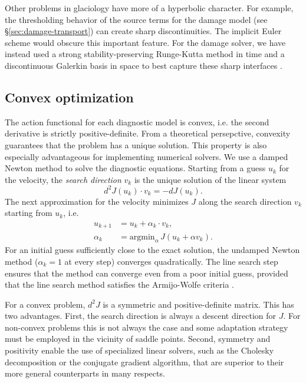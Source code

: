 \documentclass[journal abbreviation, manuscript]{copernicus}
\begin{document}
Other problems in glaciology have more of a hyperbolic character.
For example, the thresholding behavior of the source terms for the damage model (see \S\ref{sec:damage-transport}) can create sharp discontinuities.
The implicit Euler scheme would obscure this important feature.
For the damage solver, we have instead used a strong stability-preserving Runge-Kutta method in time and a discontinuous Galerkin basis in space to best capture these sharp interfaces \citep{shu1988efficient}.


\subsection{Convex optimization}

The action functional for each diagnostic model is convex, i.e. the second derivative is strictly positive-definite.
From a theoretical persepctive, convexity guarantees that the problem has a unique solution.
This property is also especially advantageous for implementing numerical solvers.
We use a damped Newton method to solve the diagnostic equations.
Starting from a guess $u_k$ for the velocity, the \emph{search direction} $v_k$ is the unique solution of the linear system
\begin{equation}
    d^2J(u_k)\cdot v_k = -dJ(u_k).
    \label{eq:newton-search-direction}
\end{equation}
The next approximation for the velocity minimizes $J$ along the search direction $v_k$ starting from $u_k$, i.e.
\begin{align}
    u_{k + 1} & = u_k + \alpha_k\cdot v_k, \nonumber\\
    \alpha_k & = \text{argmin}_\alpha \hspace{2pt}J(u_k + \alpha v_k).
\end{align}
For an initial guess sufficiently close to the exact solution, the undamped Newton method ($\alpha_k = 1$ at every step) converges quadratically.
The line search step ensures that the method can converge even from a poor initial guess, provided that the line search method satisfies the Armijo-Wolfe criteria \citep{nocedal2006numerical}.

For a convex problem, $d^2J$ is a symmetric and positive-definite matrix.
This has two advantages.
First, the search direction is always a descent direction for $J$.
For non-convex problems this is not always the case and some adaptation strategy must be employed in the vicinity of saddle points.
Second, symmetry and positivity enable the use of specialized linear solvers, such as the Cholesky decomposition or the conjugate gradient algorithm, that are superior to their more general counterparts in many respects.
\end{document}
